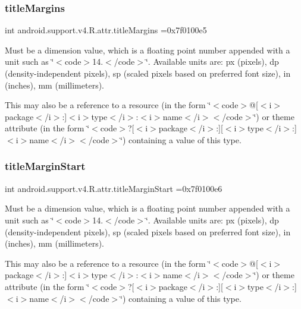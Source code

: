 \subsubsection{\texorpdfstring{title\+Margins}{titleMargins}}
{\footnotesize\ttfamily int android.\+support.\+v4.\+R.\+attr.\+title\+Margins =0x7f0100e5\hspace{0.3cm}{\ttfamily [static]}}

Must be a dimension value, which is a floating point number appended with a unit such as \char`\"{}$<$code$>$14.\+5sp$<$/code$>$\char`\"{}. Available units are\+: px (pixels), dp (density-\/independent pixels), sp (scaled pixels based on preferred font size), in (inches), mm (millimeters). 

This may also be a reference to a resource (in the form \char`\"{}$<$code$>$@\mbox{[}$<$i$>$package$<$/i$>$\+:\mbox{]}$<$i$>$type$<$/i$>$\+:$<$i$>$name$<$/i$>$$<$/code$>$\char`\"{}) or theme attribute (in the form \char`\"{}$<$code$>$?\mbox{[}$<$i$>$package$<$/i$>$\+:\mbox{]}\mbox{[}$<$i$>$type$<$/i$>$\+:\mbox{]}$<$i$>$name$<$/i$>$$<$/code$>$\char`\"{}) containing a value of this type. \mbox{\label{classandroid_1_1support_1_1v4_1_1R_1_1attr_ad5b0a1d0fcf3268e1431e0d357bb7cb8}} 
\subsubsection{\texorpdfstring{title\+Margin\+Start}{titleMarginStart}}
{\footnotesize\ttfamily int android.\+support.\+v4.\+R.\+attr.\+title\+Margin\+Start =0x7f0100e6\hspace{0.3cm}{\ttfamily [static]}}

Must be a dimension value, which is a floating point number appended with a unit such as \char`\"{}$<$code$>$14.\+5sp$<$/code$>$\char`\"{}. Available units are\+: px (pixels), dp (density-\/independent pixels), sp (scaled pixels based on preferred font size), in (inches), mm (millimeters). 

This may also be a reference to a resource (in the form \char`\"{}$<$code$>$@\mbox{[}$<$i$>$package$<$/i$>$\+:\mbox{]}$<$i$>$type$<$/i$>$\+:$<$i$>$name$<$/i$>$$<$/code$>$\char`\"{}) or theme attribute (in the form \char`\"{}$<$code$>$?\mbox{[}$<$i$>$package$<$/i$>$\+:\mbox{]}\mbox{[}$<$i$>$type$<$/i$>$\+:\mbox{]}$<$i$>$name$<$/i$>$$<$/code$>$\char`\"{}) containing a value of this type. \mbox{\label{classandroid_1_1support_1_1v4_1_1R_1_1attr_a21cd245009a24be7a8a154fd9a167b5e}} 
